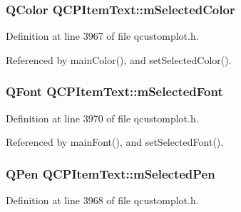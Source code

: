 \hypertarget{class_q_c_p_item_text_a7eb64e42f5f7998a97d8907ad25933c1}{}
\subsubsection[{m\+Selected\+Color}]{\setlength{\rightskip}{0pt plus 5cm}Q\+Color Q\+C\+P\+Item\+Text\+::m\+Selected\+Color\hspace{0.3cm}{\ttfamily [protected]}}\label{class_q_c_p_item_text_a7eb64e42f5f7998a97d8907ad25933c1}


Definition at line 3967 of file qcustomplot.\+h.



Referenced by main\+Color(), and set\+Selected\+Color().

\hypertarget{class_q_c_p_item_text_a6702f141fae590b2f4f1ec02fe9f8bd5}{}
\subsubsection[{m\+Selected\+Font}]{\setlength{\rightskip}{0pt plus 5cm}Q\+Font Q\+C\+P\+Item\+Text\+::m\+Selected\+Font\hspace{0.3cm}{\ttfamily [protected]}}\label{class_q_c_p_item_text_a6702f141fae590b2f4f1ec02fe9f8bd5}


Definition at line 3970 of file qcustomplot.\+h.



Referenced by main\+Font(), and set\+Selected\+Font().

\hypertarget{class_q_c_p_item_text_a8eaec649606d6ead2d8d4dcb5691777c}{}
\subsubsection[{m\+Selected\+Pen}]{\setlength{\rightskip}{0pt plus 5cm}Q\+Pen Q\+C\+P\+Item\+Text\+::m\+Selected\+Pen\hspace{0.3cm}{\ttfamily [protected]}}\label{class_q_c_p_item_text_a8eaec649606d6ead2d8d4dcb5691777c}


Definition at line 3968 of file qcustomplot.\+h.



